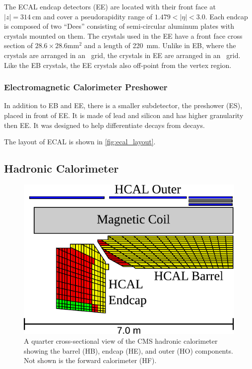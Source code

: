 The ECAL endcap detectors (EE) are located with their front face at
$|z|=\SI{314}{\centi\meter}$ and cover a pseudorapidity range of $1.479 <
|\eta| < 3.0$. Each endcap is composed of two ``Dees'' consisting of
semi-circular aluminum plates with crystals mounted on them. The crystals used
in the EE have a front face cross section of $28.6 \times 28.6
\si{\milli\meter\squared}$ and a length of \SI{220}{\milli\meter}. Unlike in
EB, where the crystals are arranged in an \coordetaphi~grid, the crystals in EE
are arranged in an \coordxy~grid. Like the EB crystals, the EE crystals also
off-point from the vertex region.

\subsubsection{Electromagnetic Calorimeter Preshower}

In addition to EB and EE, there is a smaller subdetector, the preshower (ES),
placed in front of EE. It is made of lead and silicon and has higher
granularity then EE. It was designed to help differentiate \pitogammagamma
decays from \higgstogammagamma decays.

The layout of ECAL is shown in \cref{fig:ecal_layout}.

\subsection{Hadronic Calorimeter}
\label{ssec:hcal}

\begin{figure}[!htbp]
    \centering
    \includegraphics[width=\textwidth]{figures/hcal_cross_section.pdf}
    \caption[
        A quarter cross-sectional view of the CMS hadronic calorimeter.
    ]{
        A quarter cross-sectional view of the CMS hadronic calorimeter showing
        the barrel (HB), endcap (HE), and outer (HO) components. Not shown is
        the forward calorimeter (HF).
    }
    \label{fig:hcal_layout}
\end{figure}

